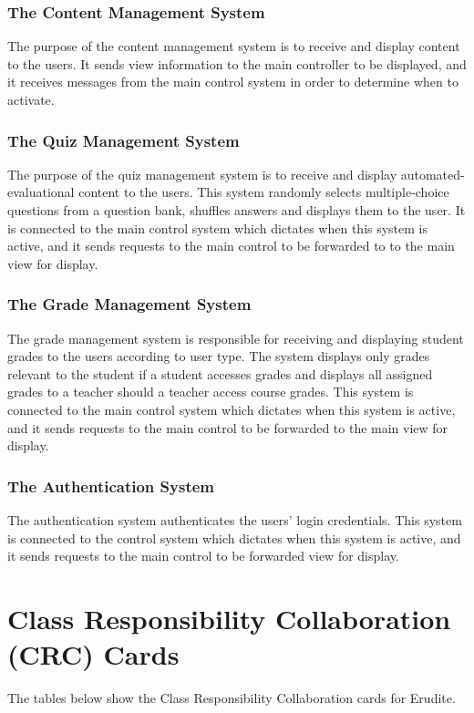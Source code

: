 \documentclass[]{article}
\begin{document}
\subsubsection{The Content Management System}
The purpose of the content management system is to receive and display content to the users. It sends view information to the main controller to be displayed, and it receives messages from the main control system in order to determine when to activate. 

\subsubsection{The Quiz Management System}
The purpose of the quiz management system is to receive and display 
automated-evaluational content to the users. This system randomly selects 
multiple-choice questions from a question bank, shuffles answers and displays 
them to the user. It is connected to the main control system which dictates when this 
system is active, and it sends requests to the main control to be forwarded to 
 to the main view for display.

\subsubsection{The Grade Management System}
The grade management system is responsible for receiving and displaying student 
grades to the users according to user type. The system displays only grades 
relevant to the student if a student accesses grades and displays all assigned 
grades to a teacher should a teacher access course grades. This system is 
connected to the main control system which dictates when this system is active, and 
it sends requests to the main control to be forwarded to the main view for display.

\subsubsection{The Authentication System}
The authentication system authenticates the users' login credentials. This system is 
connected to the control system which dictates when this system is active, and 
it sends requests to the main control to be forwarded view for display.



\section{Class Responsibility Collaboration (CRC) Cards}
\label{sec:class_responsibility_collaboration_crc_cards}
The tables below show the Class Responsibility Collaboration cards for Erudite.
\end{document}
